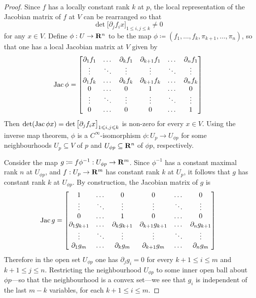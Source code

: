 \begin{proof}
Since \(f\) has a locally constant rank \(k\) at \(p\), the local representation
of the Jacobian matrix of \(f\) at \(V\) can be rearranged so that
\[
\det \Big[\partial_j f_i x \Big]_{1 \leq i, j \leq k} \neq 0
\]
for any \(x \in V\). Define \(\phi: U \to \mathbf{R}^n\) to be the map
\(\phi \coloneq (f_1, \dots, f_k, \pi_{k+1}, \dots, \pi_n)\), so that one has a
local Jacobian matrix at \(V\) given by
\[
\operatorname{Jac} \phi =
\begin{bmatrix}
  \partial_1 f_1 &\dots  &\partial_k f_1
  &\partial_{k+1} f_1 &\dots  & \partial_n f_1
  \\
  \vdots           &\ddots &\vdots
  &\vdots &\ddots &\vdots
  \\
  \partial_1 f_k &\dots  &\partial_k f_k
  &\partial_{k+1} f_k & \dots &\partial_n f_k
  \\
  0                &\dots  &0
  &1               &\dots  &0
  \\
  \vdots           &\ddots &\vdots
  &\vdots          &\ddots &\vdots
  \\
  0                &\dots  &0
  &0               &\dots  &1
\end{bmatrix}
\]
Then
\(\det(\operatorname{Jac} \phi x) = \det\big[\partial_j f_i x \big]_{1 \leqslant i, j \leqslant k}\) is
non-zero for every \(x \in V\). Using the inverse map theorem, \(\phi\) is a
\(C^{\infty}\)-isomorphism \(\phi: U_p \to U_{\phi p}\) for some neighbourhoods
\(U_p \subseteq V\) of \(p\) and \(U_{\phi p} \subseteq \mathbf{R}^n\) of \(\phi p\),
respectively.

Consider the map \(g \coloneq f \phi^{-1}: U_{\phi p} \to \mathbf{R}^m\). Since
\(\phi^{-1}\) has a constant maximal rank \(n\) at \(U_{\phi p}\), and
\(f: U_p \to \mathbf{R}^m\) has constant rank \(k\) at \(U_p\), it follows that \(g\)
has constant rank \(k\) at \(U_{\phi p}\). By construction, the Jacobian matrix
of \(g\) is
\[
\operatorname{Jac} g =
\begin{bmatrix}
  1                &\dots  &0
  &0               &\dots  &0
  \\
  \vdots           &\ddots &\vdots
  &\vdots          &\ddots &\vdots
  \\
  0                &\dots  &1
  &0               &\dots  &0
  \\
  \partial_1 g_{k+1} &\dots  &\partial_k g_{k+1}
  &\partial_{k+1} g_{k+1} &\dots  & \partial_n g_{k+1}
  \\
  \vdots           &\ddots &\vdots
  &\vdots &\ddots &\vdots
  \\
  \partial_1 g_m &\dots  &\partial_k g_m
  &\partial_{k+1} g_m & \dots &\partial_n g_m
\end{bmatrix}
\]
Therefore in the open set \(U_{\phi p}\) one has \(\partial_j g_i = 0\) for
every \(k+1 \leq i \leq m\) and \(k+1 \leq j \leq n\).
Restricting the neighbourhood \(U_{\phi p}\) to some inner open ball about \(\phi
p\)---so that the neighbourhood is a convex set---we see that \(g_i\) is
independent of the last \(m-k\) variables, for each \(k+1 \leq i \leq m\).


\end{proof}
